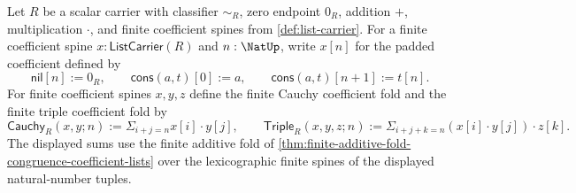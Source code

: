 \begin{definition}
\label{def:polynomial-padded-coefficients-cauchy-folds}
Let $R$ be a scalar carrier with classifier $\sim_R$, zero endpoint $0_R$, addition $+$, multiplication $\cdot$, and finite coefficient spines from \autoref{def:list-carrier}. For a finite coefficient spine $x:\mathsf{ListCarrier}(R)$ and $n:\NatUp$, write $x[n]$ for the padded coefficient defined by
$$
\mathsf{nil}[n]:=0_R,\qquad \mathsf{cons}(a,t)[0]:=a,\qquad \mathsf{cons}(a,t)[n+1]:=t[n].
$$
For finite coefficient spines $x,y,z$ define the finite Cauchy coefficient fold and the finite triple coefficient fold by
$$
\mathsf{Cauchy}_R(x,y;n):=\Sigma_{i+j=n}x[i]\cdot y[j],\qquad \mathsf{Triple}_R(x,y,z;n):=\Sigma_{i+j+k=n}(x[i]\cdot y[j])\cdot z[k].
$$
The displayed sums use the finite additive fold of \autoref{thm:finite-additive-fold-congruence-coefficient-lists} over the lexicographic finite spines of the displayed natural-number tuples.
\end{definition}

